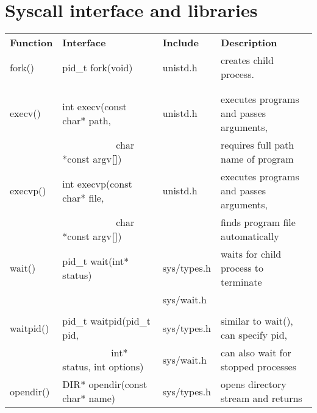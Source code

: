 \documentclass{article}
\begin{document}
\section{Syscall interface and libraries}
\begin{longtable}{llll}
    \bf Function & \bf Interface & \bf Include & \bf Description
    \\
    fork() & pid\_t fork(void) & unistd.h & creates child process.
    \\
    & & & %
    \\
    & & & %
    \\ \hline
    execv() & int execv(const char* path, & unistd.h & executes programs and 
        passes arguments, 
    \\
    &  \ \ \ \ \ \ \ \ \ \ \ char *const argv\textbf{[]}) & &requires full path name of program
    \\ \hline
    execvp() & int execvp(const char* file, & unistd.h & executes programs and 
        passes arguments, 
    \\
    &  \ \ \ \ \ \ \ \ \ \ \ char *const argv\textbf{[]}) & &finds program file automatically
    \\ \hline
    wait() & pid\_t wait(int* status) & sys/types.h & waits for child process to terminate
    \\
    & & sys/wait.h & %
    \\
    & & & %
    \\ \hline
    waitpid() & pid\_t waitpid(pid\_t pid, & sys/types.h & similar to wait(), can specify pid,
    \\
    & \ \ \ \ \ \ \ \ \ \ int* status, int options) & sys/wait.h & can also wait for stopped processes
    \\ \hline
    opendir() & DIR* opendir(const char* name) & sys/types.h & opens directory stream and returns

\end{longtable}
\end{document}
